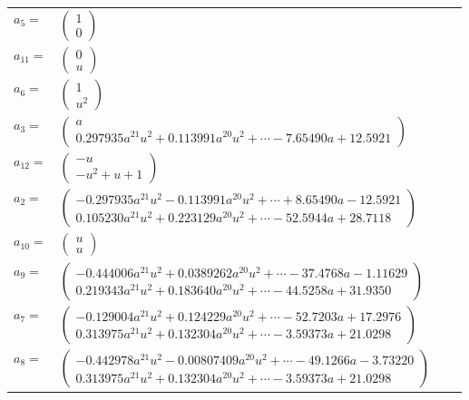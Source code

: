 \documentclass[1p]{elsarticle_modified}
\theoremstyle{definition}
\begin{document}
\begin{tabular}{m{7pt} m{180pt} m{7pt} m{180pt} }
\flushright $a_{5}=$&$\begin{pmatrix}1\\0\end{pmatrix}$ \\
\flushright $a_{11}=$&$\begin{pmatrix}0\\u\end{pmatrix}$ \\
\flushright $a_{6}=$&$\begin{pmatrix}1\\u^2\end{pmatrix}$ \\
\flushright $a_{3}=$&$\begin{pmatrix}a\\0.297935 a^{21} u^{2}+0.113991 a^{20} u^{2}+\cdots-7.65490 a+12.5921\end{pmatrix}$ \\
\flushright $a_{12}=$&$\begin{pmatrix}- u\\- u^2+u+1\end{pmatrix}$ \\
\flushright $a_{2}=$&$\begin{pmatrix}-0.297935 a^{21} u^{2}-0.113991 a^{20} u^{2}+\cdots+8.65490 a-12.5921\\0.105230 a^{21} u^{2}+0.223129 a^{20} u^{2}+\cdots-52.5944 a+28.7118\end{pmatrix}$ \\
\flushright $a_{10}=$&$\begin{pmatrix}u\\u\end{pmatrix}$ \\
\flushright $a_{9}=$&$\begin{pmatrix}-0.444006 a^{21} u^{2}+0.0389262 a^{20} u^{2}+\cdots-37.4768 a-1.11629\\0.219343 a^{21} u^{2}+0.183640 a^{20} u^{2}+\cdots-44.5258 a+31.9350\end{pmatrix}$ \\
\flushright $a_{7}=$&$\begin{pmatrix}-0.129004 a^{21} u^{2}+0.124229 a^{20} u^{2}+\cdots-52.7203 a+17.2976\\0.313975 a^{21} u^{2}+0.132304 a^{20} u^{2}+\cdots-3.59373 a+21.0298\end{pmatrix}$ \\
\flushright $a_{8}=$&$\begin{pmatrix}-0.442978 a^{21} u^{2}-0.00807409 a^{20} u^{2}+\cdots-49.1266 a-3.73220\\0.313975 a^{21} u^{2}+0.132304 a^{20} u^{2}+\cdots-3.59373 a+21.0298\end{pmatrix}$ \\

\end{tabular}
\end{document}
